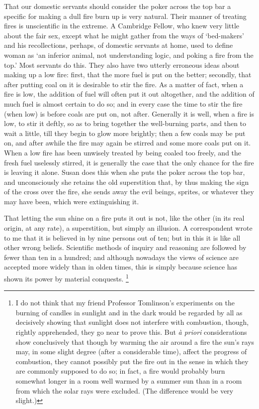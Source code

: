 \documentclass[letterpaper,12pt,oneside,openany]{memoir}
\begin{document}
That our domestic servants should consider the
poker across the top bar a specific for making a dull
fire burn up is very natural. Their manner of treating
fires is unscientific in the extreme. A Cambridge
Fellow, who knew very little about the fair sex,
except what he might gather from the ways of `bed-makers'
and his recollections, perhaps, of domestic
servants at home, used to define woman as `an inferior
animal, not understanding logic, and poking a fire
from the top.' Most servants do this. They also have
two utterly erroneous ideas about making up a low
fire: first, that the more fuel is put on the better;
secondly, that after putting coal on it is desirable to stir
the fire. As a matter of fact, when a fire is low, the
addition of fuel will often put it out altogether, and the
addition of much fuel is almost certain to do so; and in
every case the time to stir the fire (when low) is before
coals are put on, not after. Generally it is well, when
a fire is low, to stir it deftly, so as to bring together
the well-burning parts, and then to wait a little, till
they begin to glow more brightly; then a few coals
may be put on, and after awhile the fire may again be
stirred and some more coals put on it. When a low fire
has been unwisely treated by being coaled too freely,
and the fresh fuel uselessly stirred, it is generally the
case that the only chance for the fire is leaving it alone.
Susan does this when she puts the poker across the
top bar, and unconsciously she retains the old superstition
that, by thus making the sign of the cross over
the fire, she sends away the evil beings, sprites, or
whatever they may have been, which were extinguishing
it.

That letting the sun shine on a fire puts it out is
not, like the other (in its real origin, at any rate), a
superstition, but simply an illusion. A correspondent
wrote to me that it is believed in by nine persons out of
ten; but in this it is like all other wrong beliefs.
Scientific methods of inquiry and reasoning are followed
by fewer than ten in a hundred; and although nowadays
the views of science are accepted more widely than
in olden times, this is simply because science has shown
its power by material conquests.%
%
\footnote{I do not think that my friend Professor Tomlinson's experiments
on the burning of candles in sunlight and in the dark would be regarded
by all as decisively showing that sunlight does not interfere
with combustion, though, rightly apprehended, they go near to prove
this. But \textit{\`a priori} considerations show conclusively that though by
warming the air around a fire the sun's rays may, in some slight
degree (after a considerable time), affect the progress of combustion,
they cannot possibly put the fire out in the sense in which
they are commonly supposed to do so; in fact, a fire would probably
burn somewhat longer in a room well warmed by a summer
sun than in a room from which the solar rays were excluded. (The
difference would be very slight.)}
\end{document}
